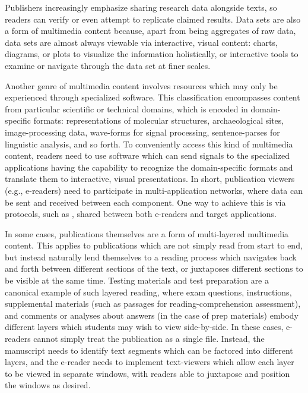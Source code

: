 \documentclass[10pt,letterpaper]{article}
\newcommand{\EPF}{\resizebox{!}{8pt}{\AcronymText{EPF}}}
\newcommand{\textscc}[1]{{\color{orr!35!black}{{%
						\fontfamily{Cabin-TLF}\fontseries{b}\selectfont{\textsc{\scriptsize{#1}}}}}}}
\newcommand{\AcronymText}[1]{{\textscc{#1}}}
\begin{document}
{{\begin{description}[leftmargin=2pt,
	labelindent=-2pt,labelsep=12pt,itemsep=13pt]
\item[Data Sets and Data Visualization]  Publishers 
increasingly emphasize sharing research data alongside 
texts, so readers can verify or even attempt to 
replicate claimed results.  Data sets are also a form 
of multimedia content because, apart from being aggregates 
of raw data, data sets are almost always viewable 
via interactive, visual content: charts, diagrams, or 
plots to visualize the information holistically, or 
interactive tools to examine or navigate through the 
data set at finer scales.  

\item[Application Networks]  Another genre of multimedia 
content involves resources which may only be experienced 
through specialized software.  This classification encompasses 
content from particular scientific or technical domains, 
which is encoded in domain-specific formats: representations 
of molecular structures, archaeological sites, image-processing 
data, wave-forms for signal processing, sentence-parses for 
linguistic analysis, and so forth.  To conveniently access 
this kind of multimedia content, readers need to use software 
which can send signals to the specialized applications 
having the capability to recognize the domain-specific 
formats and translate them to interactive, 
visual presentations.  In short, publication viewers 
(e.g., e-readers) need to participate in multi-application 
networks, where data can be sent and received between 
each component.  One way to achieve this is via 
protocols, such as \EPF{}, shared between both e-readers and 
target applications.

\item[Publications-as-Applications]  In some 
cases, publications themselves are a form of 
multi-layered multimedia content.  This applies 
to publications which are not simply read from 
start to end, but instead naturally lend 
themselves to a reading process which navigates 
back and forth between different sections of 
the text, or juxtaposes different sections to be 
visible at the same time.  Testing materials 
and test preparation are a canonical example 
of such layered reading, where exam questions, 
instructions, supplemental materials (such 
as passages for reading-comprehension 
assessment), and comments or analyses about 
answers (in the case of prep materials) 
embody different layers which 
students may wish to view side-by-side.  
In these cases, e-readers cannot simply 
treat the publication as a single file.  
Instead, the manuscript needs 
to identify text segments which can be factored 
into different layers, and the e-reader 
needs to implement text-viewers which allow 
each layer to be viewed in separate windows, 
with readers able to juxtapose and position the 
windows as desired. 
\end{description}\vspace{-2em}
}


}
\end{document}
